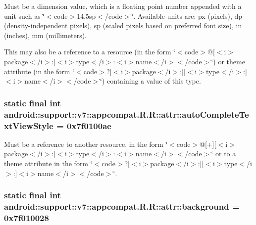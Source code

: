 Must be a dimension value, which is a floating point number appended with a unit such as \char`\"{}$<$code$>$14.5sp$<$/code$>$\char`\"{}. Available units are: px (pixels), dp (density-independent pixels), sp (scaled pixels based on preferred font size), in (inches), mm (millimeters). 

This may also be a reference to a resource (in the form \char`\"{}$<$code$>$@\mbox{[}$<$i$>$package$<$/i$>$:\mbox{]}$<$i$>$type$<$/i$>$:$<$i$>$name$<$/i$>$$<$/code$>$\char`\"{}) or theme attribute (in the form \char`\"{}$<$code$>$?\mbox{[}$<$i$>$package$<$/i$>$:\mbox{]}\mbox{[}$<$i$>$type$<$/i$>$:\mbox{]}$<$i$>$name$<$/i$>$$<$/code$>$\char`\"{}) containing a value of this type. \hypertarget{classandroid_1_1support_1_1v7_1_1appcompat_1_1_r_1_1attr_a7ab5703390e4742de19329e9dc780f2}{
\subsubsection[{autoCompleteTextViewStyle}]{\setlength{\rightskip}{0pt plus 5cm}static final int android::support::v7::appcompat.R.R::attr::autoCompleteTextViewStyle = 0x7f0100ae}}
\label{classandroid_1_1support_1_1v7_1_1appcompat_1_1_r_1_1attr_a7ab5703390e4742de19329e9dc780f2}


Must be a reference to another resource, in the form \char`\"{}$<$code$>$@\mbox{[}+\mbox{]}\mbox{[}$<$i$>$package$<$/i$>$:\mbox{]}$<$i$>$type$<$/i$>$:$<$i$>$name$<$/i$>$$<$/code$>$\char`\"{} or to a theme attribute in the form \char`\"{}$<$code$>$?\mbox{[}$<$i$>$package$<$/i$>$:\mbox{]}\mbox{[}$<$i$>$type$<$/i$>$:\mbox{]}$<$i$>$name$<$/i$>$$<$/code$>$\char`\"{}. \hypertarget{classandroid_1_1support_1_1v7_1_1appcompat_1_1_r_1_1attr_b1e38fea1fd79699c88bc8c1a899a374}{
\subsubsection[{background}]{\setlength{\rightskip}{0pt plus 5cm}static final int android::support::v7::appcompat.R.R::attr::background = 0x7f010028}}
\label{classandroid_1_1support_1_1v7_1_1appcompat_1_1_r_1_1attr_b1e38fea1fd79699c88bc8c1a899a374}


